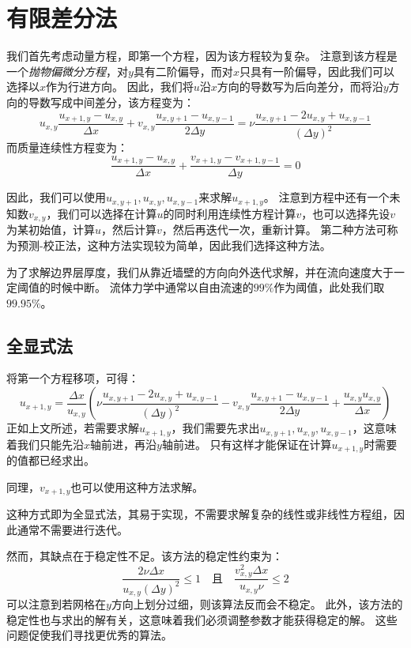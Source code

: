 \documentclass[12pt]{ctexart}
\begin{document}
\section{有限差分法}

我们首先考虑动量方程，即第一个方程，因为该方程较为复杂。
注意到该方程是一个\emph{抛物偏微分方程}，对$y$具有二阶偏导，而对$x$只具有一阶偏导，因此我们可以选择以$x$作为行进方向。
因此，我们将$u$沿$x$方向的导数写为后向差分，而将沿$y$方向的导数写成中间差分，该方程变为：
\[ 
    u_{x,y} \frac{u_{x+1, y} - u_{x,y}}{\Delta x} + v_{x,y} \frac{u_{x,y+1} - u_{x,y-1}}{2 \Delta y} = 
    \nu \frac{u_{x,y+1} - 2 u_{x, y} + u_{x,y-1}}{(\Delta y)^2}
\]
而质量连续性方程变为：
\[ \frac{u_{x+1,y} - u_{x,y}}{\Delta x} + \frac{v_{x+1,y} - v_{x+1,y-1}}{\Delta y} = 0 \]

因此，我们可以使用$u_{x,y+1}, u_{x, y}, u_{x,y-1}$来求解$u_{x+1,y}$。
注意到方程中还有一个未知数$v_{x,y}$，我们可以选择在计算$u$的同时利用连续性方程计算$v$，也可以选择先设$v$为某初始值，计算$u$，然后计算$v$，然后再迭代一次，重新计算。
第二种方法可称为预测-校正法，这种方法实现较为简单，因此我们选择这种方法。

为了求解边界层厚度，我们从靠近墙壁的方向向外迭代求解，并在流向速度大于一定阈值的时候中断。
流体力学中通常以自由流速的$99\%$作为阈值，此处我们取$99.95\%$。

\subsection{全显式法}

将第一个方程移项，可得：
\[ 
    u_{x+1,y} = \frac{\Delta x}{u_{x,y}} 
    \left( 
        \nu \frac{u_{x,y+1} - 2 u_{x, y} + u_{x,y-1}}{(\Delta y)^2}  
        - v_{x,y} \frac{u_{x,y+1} - u_{x, y-1}}{2 \Delta y} + \frac{u_{x,y} u_{x,y}}{\Delta x}
    \right) 
\]
正如上文所述，若需要求解$u_{x+1,y}$，我们需要先求出$u_{x,y+1}, u_{x, y}, u_{x,y-1}$，这意味着我们只能先沿$x$轴前进，再沿$y$轴前进。
只有这样才能保证在计算$u_{x+1, y}$时需要的值都已经求出。

同理，$v_{x+1,y}$也可以使用这种方法求解。

这种方式即为全显式法，其易于实现，不需要求解复杂的线性或非线性方程组，因此通常不需要进行迭代。

然而，其缺点在于稳定性不足。该方法的稳定性约束为\cite{book:9105}：
\[ \frac{2\nu \Delta x}{u_{x,y} (\Delta y)^2} \le 1 \quad \text{且} \quad \frac{v_{x,y}^2 \Delta x}{u_{x,y} \nu} \le 2 \]
可以注意到若网格在$y$方向上划分过细，则该算法反而会不稳定。
此外，该方法的稳定性也与求出的解有关，这意味着我们必须调整参数才能获得稳定的解。
这些问题促使我们寻找更优秀的算法。
\end{document}
